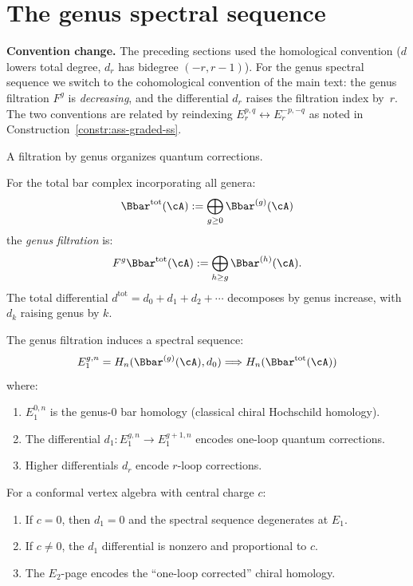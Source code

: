 \section{The genus spectral sequence}
\label{sec:genus-spectral-sequence}

\medskip\noindent\textbf{Convention change.}  The preceding sections used the homological convention ($d$ lowers total degree, $d_r$ has bidegree $(-r,r{-}1)$).  For the genus spectral sequence we switch to the cohomological convention of the main text: the genus filtration $F^g$ is \emph{decreasing}, and the differential $d_r$ raises the filtration index by~$r$.  The two conventions are related by reindexing $E_r^{p,q} \leftrightarrow E_r^{-p,-q}$ as noted in Construction~\ref{constr:ass-graded-ss}.

\medskip
A filtration by genus organizes quantum corrections.

\begin{construction}
\label{constr:genus-filtration}
For the total bar complex incorporating all genera:
\[
\Bbar^{\mathrm{tot}}(\cA) := \bigoplus_{g \geq 0} \Bbar^{(g)}(\cA)
\]
the \emph{genus filtration} is:
\[
F^g \Bbar^{\mathrm{tot}}(\cA) := \bigoplus_{h \geq g} \Bbar^{(h)}(\cA).
\]
The total differential $d^{\mathrm{tot}} = d_0 + d_1 + d_2 + \cdots$ decomposes 
by genus increase, with $d_k$ raising genus by $k$.
\end{construction}

\begin{theorem}
\label{thm:genus-ss}
The genus filtration induces a spectral sequence:
\[
E_1^{g,n} = H_n(\Bbar^{(g)}(\cA), d_0) \Longrightarrow H_n(\Bbar^{\mathrm{tot}}(\cA))
\]
where:
\begin{enumerate}[label=(\roman*)]
\item $E_1^{0,n}$ is the genus-0 bar homology (classical chiral Hochschild homology).
\item The differential $d_1: E_1^{g,n} \to E_1^{g+1,n}$ encodes one-loop quantum 
corrections.
\item Higher differentials $d_r$ encode $r$-loop corrections.
\end{enumerate}
\end{theorem}

\begin{proposition}
\label{prop:central-charge-d1}
For a conformal vertex algebra with central charge $c$:
\begin{enumerate}[label=(\roman*)]
\item If $c = 0$, then $d_1 = 0$ and the spectral sequence degenerates at $E_1$.
\item If $c \neq 0$, the $d_1$ differential is nonzero and proportional to $c$.
\item The $E_2$-page encodes the ``one-loop corrected'' chiral homology.
\end{enumerate}
\end{proposition}

